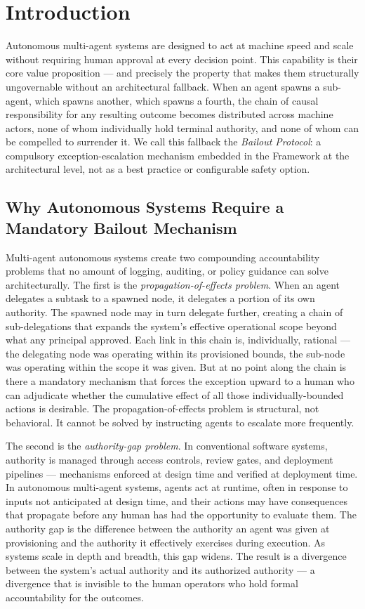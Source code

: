 \section{Introduction}
\label{sec:introduction}

Autonomous multi-agent systems are designed to act at machine speed and scale without requiring human approval at every decision point. This capability is their core value proposition — and precisely the property that makes them structurally ungovernable without an architectural fallback. When an agent spawns a sub-agent, which spawns another, which spawns a fourth, the chain of causal responsibility for any resulting outcome becomes distributed across machine actors, none of whom individually hold terminal authority, and none of whom can be compelled to surrender it. We call this fallback the \emph{Bailout Protocol}: a compulsory exception-escalation mechanism embedded in the \bxthree{} Framework at the architectural level, not as a best practice or configurable safety option.

\subsection{Why Autonomous Systems Require a Mandatory Bailout Mechanism}

Multi-agent autonomous systems create two compounding accountability problems that no amount of logging, auditing, or policy guidance can solve architecturally. The first is the \emph{propagation-of-effects problem}. When an agent delegates a subtask to a spawned node, it delegates a portion of its own authority. The spawned node may in turn delegate further, creating a chain of sub-delegations that expands the system's effective operational scope beyond what any principal approved. Each link in this chain is, individually, rational — the delegating node was operating within its provisioned bounds, the sub-node was operating within the scope it was given. But at no point along the chain is there a mandatory mechanism that forces the exception upward to a human who can adjudicate whether the cumulative effect of all those individually-bounded actions is desirable. The propagation-of-effects problem is structural, not behavioral. It cannot be solved by instructing agents to escalate more frequently.

The second is the \emph{authority-gap problem}. In conventional software systems, authority is managed through access controls, review gates, and deployment pipelines — mechanisms enforced at design time and verified at deployment time. In autonomous multi-agent systems, agents act at runtime, often in response to inputs not anticipated at design time, and their actions may have consequences that propagate before any human has had the opportunity to evaluate them. The authority gap is the difference between the authority an agent was given at provisioning and the authority it effectively exercises during execution. As systems scale in depth and breadth, this gap widens. The result is a divergence between the system's actual authority and its authorized authority — a divergence that is invisible to the human operators who hold formal accountability for the outcomes.

